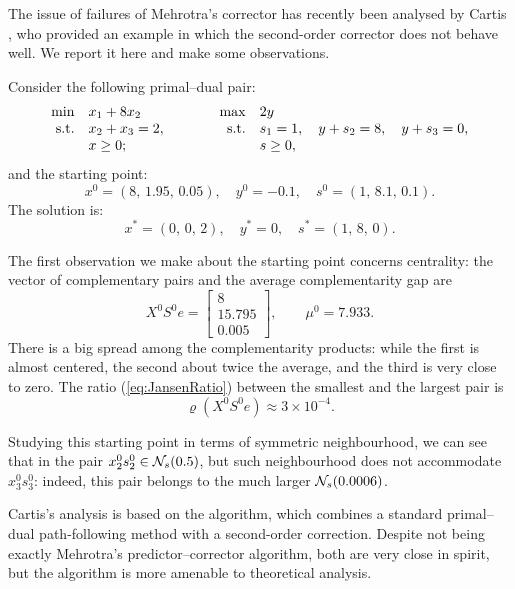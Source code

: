 The issue of failures of Mehrotra's corrector
has recently been analysed by Cartis \cite{Cartis04}, 
who provided an example in which the second-order corrector does 
not behave well. 
We report it here and make some observations.

\begin{example}  \label{ex:Coralia}
Consider the following primal--dual pair:
\[
  \begin{array}{rlp{2em}rl}
    \min        & x_1 + 8 x_2    & & \max  & 2 y \\
    \mbox{s.t.} & x_2 + x_3 = 2, & & \mbox{s.t.} & s_1 = 1,\quad
                                                   y + s_2 = 8,\quad
						   y + s_3 = 0, \\
                & x \geq 0;      & &             & s \geq 0,
  \end{array}
\]
and the starting point:
\[
  x^0 = (8,\, 1.95,\, 0.05), \quad y^0 = -0.1, \quad s^0 = (1,\, 8.1,\, 0.1).
\]
The solution is:
\[
  x^* = (0,\, 0,\, 2), \quad y^* = 0, \quad s^* = (1,\, 8,\, 0).
\]
\end{example}

The first observation we make about the starting point 
concerns centrality: the vector of complementary pairs and
the average complementarity gap are
\[
  X^0S^0e = \left[ \begin{array}{c}
            8 \\ 15.795 \\ 0.005
            \end{array} \right],
  \qquad
  \mu^0 = 7.933.
\]
There is a big spread among the
complementarity products: while the first is almost centered, the second
about twice the average, and the third is very close to zero. 
The ratio (\ref{eq:JansenRatio}) between the smallest and the largest pair is
\[
  \varrho(X^0S^0e) \approx 3 \times 10^{-4}.
\]

Studying this starting point in terms of symmetric neighbourhood,
we can see that in the pair $x^0_2s^0_2 \in \mathcal{N}_s(0.5)$, but 
such neighbourhood does not accommodate $x^0_3s^0_3$:
indeed, this pair belongs to the much larger $\mathcal{N}_s(0.0006)$.

Cartis's analysis is based on the \PDC algorithm,
which combines a standard primal--dual path-following method with 
a second-order correction. Despite not being exactly Mehrotra's 
predictor--corrector algorithm, both are very close in spirit,
but the \PDC algorithm is more amenable to theoretical analysis.

